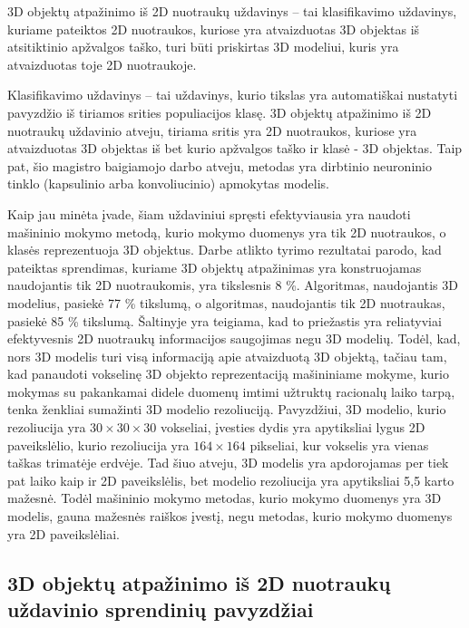 
3D objektų atpažinimo iš 2D nuotraukų uždavinys -- tai klasifikavimo uždavinys, kuriame pateiktos 2D nuotraukos, kuriose yra atvaizduotas 3D objektas iš atsitiktinio apžvalgos taško, turi būti priskirtas 3D modeliui, kuris yra atvaizduotas toje 2D nuotraukoje.

Klasifikavimo uždavinys -- tai uždavinys, kurio tikslas yra automatiškai nustatyti pavyzdžio iš tiriamos srities populiacijos klasę. 3D objektų atpažinimo iš 2D nuotraukų uždavinio atveju, tiriama sritis yra 2D nuotraukos, kuriose yra atvaizduotas 3D objektas iš bet kurio apžvalgos taško ir klasė - 3D objektas. Taip pat, šio magistro baigiamojo darbo atveju, metodas yra dirbtinio neuroninio tinklo (kapsulinio arba konvoliucinio) apmokytas modelis.

Kaip jau minėta įvade, šiam uždaviniui spręsti efektyviausia yra naudoti mašininio mokymo metodą, kurio mokymo duomenys yra tik 2D nuotraukos, o klasės reprezentuoja 3D objektus. Darbe \cite{dbnExp} atlikto tyrimo rezultatai parodo, kad pateiktas sprendimas, kuriame 3D objektų atpažinimas yra konstruojamas naudojantis tik 2D nuotraukomis, yra tikslesnis 8 \%. Algoritmas, naudojantis 3D modelius, pasiekė 77 \% tikslumą, o algoritmas, naudojantis tik 2D nuotraukas, pasiekė 85 \% tikslumą. Šaltinyje \cite{cnnExp1} yra teigiama, kad to priežastis yra reliatyviai efektyvesnis 2D nuotraukų informacijos saugojimas negu 3D modelių. Todėl, kad, nors 3D modelis turi visą informaciją apie atvaizduotą 3D objektą, tačiau tam, kad panaudoti vokselinę 3D objekto reprezentaciją mašininiame mokyme, kurio mokymas su pakankamai didele duomenų imtimi užtruktų racionalų laiko tarpą, tenka ženkliai sumažinti 3D modelio rezoliuciją. Pavyzdžiui, 3D modelio, kurio rezoliucija yra $30\times30\times30$ vokseliai, įvesties dydis yra apytiksliai lygus 2D paveikslėlio, kurio rezoliucija yra $164\times164$ pikseliai, kur vokselis yra vienas taškas trimatėje erdvėje. Tad šiuo atveju, 3D modelis yra apdorojamas per tiek pat laiko kaip ir 2D paveikslėlis, bet modelio rezoliucija yra apytiksliai 5,5 karto mažesnė. Todėl mašininio mokymo metodas, kurio mokymo duomenys yra 3D modelis, gauna mažesnės raiškos įvestį, negu metodas, kurio mokymo duomenys yra 2D paveikslėliai.

\subsection{3D objektų atpažinimo iš 2D nuotraukų uždavinio sprendinių pavyzdžiai}

